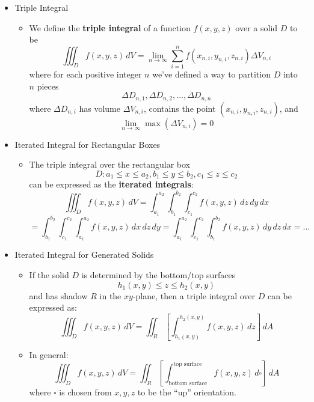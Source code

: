 \documentclass[12pt]{article}
\newcommand{\dvar}[1]{\,d{#1}}
\renewcommand{\d}[1]{\dvar{#1}}
\newcommand{\<}{\left<}
\renewcommand{\>}{\right>}
\begin{document}
  \begin{itemize}

  \item Triple Integral
    \begin{itemize}
    \item We define the \textbf{triple integral} of a function $f(x,y,z)$ over a solid $D$ to be 
        \[
          \iiint_D f(x,y,z)\d{V} = \lim_{n\to\infty}\sum_{i=1}^n f(x_{n,i},y_{n,i},z_{n,i})\Delta V_{n,i}
        \]
      where for each positive integer $n$ we've defined a way to partition $D$ into $n$ pieces 
        \[
          \Delta D_{n,1},\Delta D_{n,2},\dots,\Delta D_{n,n}
        \]
      where $\Delta D_{n,i}$ has volume $\Delta V_{n,i}$, contains the point $(x_{n,i},y_{n,i},z_{n,i})$, and \[\lim_{n\to\infty} \max(\Delta V_{n,i}) = 0\]
    \end{itemize}

  \item Iterated Integral for Rectangular Boxes
    \begin{itemize}
      \item The triple integral over the rectangular box
        \[
          D: a_1\leq x\leq a_2, b_1\leq y\leq b_2, c_1\leq z\leq c_2
        \]
        can be expressed as the \textbf{iterated integrals}:
      \[
        \iiint_D f(x,y,z)\d{V} = \int_{a_1}^{a_2}\int_{b_1}^{b_2}\int_{c_1}^{c_2} f(x,y,z)\d{z}\d{y}\d{x}
      \]
      \[
        = \int_{b_1}^{b_2}\int_{c_1}^{c_2}\int_{a_1}^{a_2} f(x,y,z)\d{x}\d{z}\d{y} 
        = \int_{a_1}^{a_2}\int_{c_1}^{c_2}\int_{b_1}^{b_2} f(x,y,z)\d{y}\d{z}\d{x} 
        = \dots
      \]
    \end{itemize}

  \item Iterated Integral for Generated Solids
    \begin{itemize}
      \item If the solid $D$ is determined by the bottom/top surfaces
        \[
          h_1(x,y)\leq z\leq h_2(x,y)
        \]
      and has shadow $R$ in the $xy$-plane, then a triple integral over $D$ can be expressed as:
        \[
          \iiint_D f(x,y,z)\d{V} = \iint_R\left[ \int_{h_1(x,y)}^{h_2(x,y)} f(x,y,z) \d{z}  \right]\d{A}
        \]
      \item In general:
        \[
          \iiint_D f(x,y,z)\d{V} = \iint_R\left[ \int_{\text{bottom surface}}^{\text{top surface}} f(x,y,z) \d{\square}  \right]\d{A}
        \]
      where $\square$ is chosen from $x,y,z$ to be the ``up'' orientation.
    \end{itemize}


\end{itemize}
\end{document}

